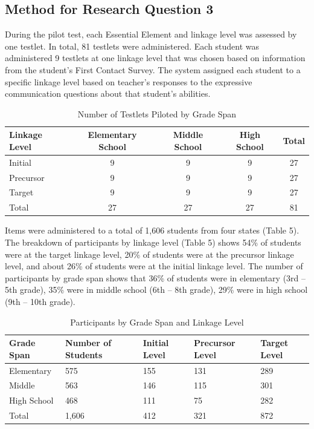 \documentclass[11.5pt]{sig-alternate} %
\begin{document}
\begin{large}
\subsection*{Method for Research Question 3}

During the pilot test, each Essential Element and linkage level was assessed by one testlet. In total, 81 testlets were administered. Each student was administered 9 testlets at one linkage level that was chosen based on information from the student’s First Contact Survey. The system assigned each student to a specific linkage level based on teacher’s responses to the expressive communication questions about that student’s abilities. 

\begin{table}[ht]
\caption{Number of Testlets Piloted by Grade Span}
\begin{tabular}{lcccc}
\hline
Linkage Level & Elementary School & Middle School & High School & Total \\ \hline
Initial	& 9 & 9 & 9 & 27 \\
Precursor & 9 & 9 & 9 & 27 \\
Target & 9 & 9 & 9 & 27 \\
Total & 27 & 27 & 27 & 81 \\ \hline
\end{tabular}
\end{table}

Items were administered to a total of 1,606 students from four states (Table 5). The breakdown of participants by linkage level (Table 5) shows 54\% of students were at the target linkage level, 20\% of students were at the precursor linkage level, and about 26\% of students were at the initial linkage level. The number of participants by grade span shows that 36\% of students were in elementary (3rd – 5th grade), 35\% were in middle school (6th – 8th grade), 29\% were in high school (9th – 10th grade).

\begin{table}[ht]
\caption{Participants by Grade Span and Linkage Level}
\begin{tabular}{lllll}
\hline
Grade Span & Number of Students & Initial Level & Precursor Level & Target Level \\ \hline
Elementary & 575 & 155 & 131 & 289 \\
Middle & 563 & 146 & 115 & 301 \\
High School & 468 & 111 & 75 & 282 \\
Total & 1,606 & 412 & 321 & 872 \\ \hline
\end{tabular}
\end{table}


\end{large}
\end{document}
